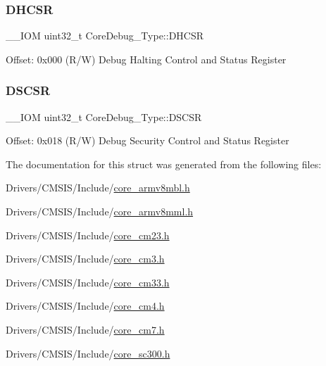 \subsubsection{\texorpdfstring{DHCSR}{DHCSR}}
{\footnotesize\ttfamily \+\_\+\+\_\+\+I\+OM uint32\+\_\+t Core\+Debug\+\_\+\+Type\+::\+D\+H\+C\+SR}

Offset\+: 0x000 (R/W) Debug Halting Control and Status Register \mbox{\label{struct_core_debug___type_ad9fa5e915e038e20b9be88d54d432fb8}} 
\subsubsection{\texorpdfstring{DSCSR}{DSCSR}}
{\footnotesize\ttfamily \+\_\+\+\_\+\+I\+OM uint32\+\_\+t Core\+Debug\+\_\+\+Type\+::\+D\+S\+C\+SR}

Offset\+: 0x018 (R/W) Debug Security Control and Status Register 

The documentation for this struct was generated from the following files\+:\begin{DoxyCompactItemize}
\item 
Drivers/\+C\+M\+S\+I\+S/\+Include/\mbox{\hyperlink{core__armv8mbl_8h}{core\+\_\+armv8mbl.\+h}}\item 
Drivers/\+C\+M\+S\+I\+S/\+Include/\mbox{\hyperlink{core__armv8mml_8h}{core\+\_\+armv8mml.\+h}}\item 
Drivers/\+C\+M\+S\+I\+S/\+Include/\mbox{\hyperlink{core__cm23_8h}{core\+\_\+cm23.\+h}}\item 
Drivers/\+C\+M\+S\+I\+S/\+Include/\mbox{\hyperlink{core__cm3_8h}{core\+\_\+cm3.\+h}}\item 
Drivers/\+C\+M\+S\+I\+S/\+Include/\mbox{\hyperlink{core__cm33_8h}{core\+\_\+cm33.\+h}}\item 
Drivers/\+C\+M\+S\+I\+S/\+Include/\mbox{\hyperlink{core__cm4_8h}{core\+\_\+cm4.\+h}}\item 
Drivers/\+C\+M\+S\+I\+S/\+Include/\mbox{\hyperlink{core__cm7_8h}{core\+\_\+cm7.\+h}}\item 
Drivers/\+C\+M\+S\+I\+S/\+Include/\mbox{\hyperlink{core__sc300_8h}{core\+\_\+sc300.\+h}}\end{DoxyCompactItemize}
